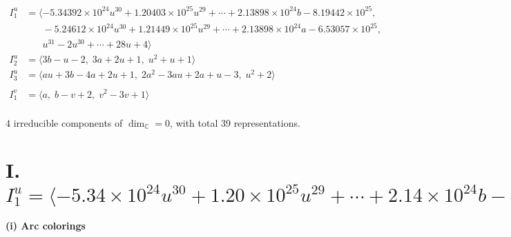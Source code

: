 \documentclass[1p]{elsarticle_modified}
\theoremstyle{definition}
\begin{document}
\begin{align*}
I^u_{1}&=\langle 
-5.34392\times10^{24} u^{30}+1.20403\times10^{25} u^{29}+\cdots+2.13898\times10^{24} b-8.19442\times10^{25},\\
\phantom{I^u_{1}}&\phantom{= \langle  }-5.24612\times10^{24} u^{30}+1.21449\times10^{25} u^{29}+\cdots+2.13898\times10^{24} a-6.53057\times10^{25},\\
\phantom{I^u_{1}}&\phantom{= \langle  }u^{31}-2 u^{30}+\cdots+28 u+4\rangle \\
I^u_{2}&=\langle 
3 b- u-2,\;3 a+2 u+1,\;u^2+u+1\rangle \\
I^u_{3}&=\langle 
a u+3 b-4 a+2 u+1,\;2 a^2-3 a u+2 a+u-3,\;u^2+2\rangle \\
\\
I^v_{1}&=\langle 
a,\;b- v+2,\;v^2-3 v+1\rangle \\
\end{align*}
\raggedright * 4 irreducible components of $\dim_{\mathbb{C}}=0$, with total 39 representations.\\
\newpage
\renewcommand{\arraystretch}{1}
\centering \section*{I. $I^u_{1}= \langle -5.34\times10^{24} u^{30}+1.20\times10^{25} u^{29}+\cdots+2.14\times10^{24} b-8.19\times10^{25},\;-5.25\times10^{24} u^{30}+1.21\times10^{25} u^{29}+\cdots+2.14\times10^{24} a-6.53\times10^{25},\;u^{31}-2 u^{30}+\cdots+28 u+4 \rangle$}
\flushleft \textbf{(i) Arc colorings}\\
\end{document}
